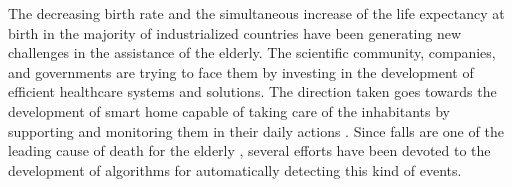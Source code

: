 The decreasing birth rate \cite{eurostat} and the simultaneous increase of the life expectancy at birth \cite{Carone2006} in the majority of industrialized countries have been generating new challenges in the assistance of the elderly. The scientific community, companies, and governments are trying to face them by investing in the development of efficient healthcare systems and solutions. The direction taken goes towards the development of smart home capable of taking care of the inhabitants by supporting and monitoring them in their daily actions \cite{Dawadi20161188, Principi2015a}. Since falls are one of the leading cause of death for the elderly \cite{mubashir2013survey}, several efforts have been devoted to the development of algorithms for automatically detecting this kind of events.




